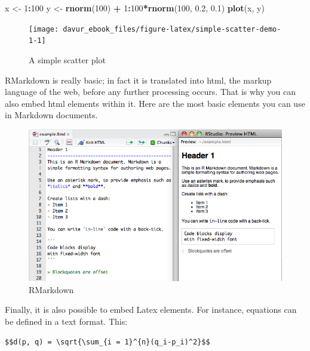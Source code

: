 \documentclass[]{book}
\newenvironment{Shaded}{\begin{snugshade}}{\end{snugshade}}
\newcommand{\DecValTok}[1]{\textcolor[rgb]{0.00,0.00,0.81}{#1}}
\newcommand{\FloatTok}[1]{\textcolor[rgb]{0.00,0.00,0.81}{#1}}
\newcommand{\KeywordTok}[1]{\textcolor[rgb]{0.13,0.29,0.53}{\textbf{#1}}}
\newcommand{\NormalTok}[1]{#1}
\newcommand{\OperatorTok}[1]{\textcolor[rgb]{0.81,0.36,0.00}{\textbf{#1}}}
\newcommand{\StringTok}[1]{\textcolor[rgb]{0.31,0.60,0.02}{#1}}
\begin{document}
\begin{Shaded}
\begin{Highlighting}[]
\NormalTok{x <-}\StringTok{ }\DecValTok{1}\OperatorTok{:}\DecValTok{100}
\NormalTok{y <-}\StringTok{ }\KeywordTok{rnorm}\NormalTok{(}\DecValTok{100}\NormalTok{) }\OperatorTok{+}\StringTok{ }\DecValTok{1}\OperatorTok{:}\DecValTok{100}\OperatorTok{*}\KeywordTok{rnorm}\NormalTok{(}\DecValTok{100}\NormalTok{, }\FloatTok{0.2}\NormalTok{, }\FloatTok{0.1}\NormalTok{)}
\KeywordTok{plot}\NormalTok{(x, y)}
\end{Highlighting}
\end{Shaded}

\begin{figure}

{\centering \texttt{[image: davur\_ebook\_files/figure-latex/simple-scatter-demo-1-1]} 

}

\caption{A simple scatter plot}\label{fig:simple-scatter-demo-1}
\end{figure}

RMarkdown is really basic; in fact it is translated into html, the markup language of the web, before any further processing occurs. That is why you can also embed html elements within it. Here are the most basic elements you can use in Markdown documents.

\begin{figure}
\centering
\includegraphics{figures/markdownOverview.png}
\caption{RMarkdown}
\end{figure}

Finally, it is also possible to embed Latex elements. For instance, equations can be defined in a text format. This:

\begin{verbatim}
$$d(p, q) = \sqrt{\sum_{i = 1}^{n}(q_i-p_i)^2}$$
\end{verbatim}
\end{document}
